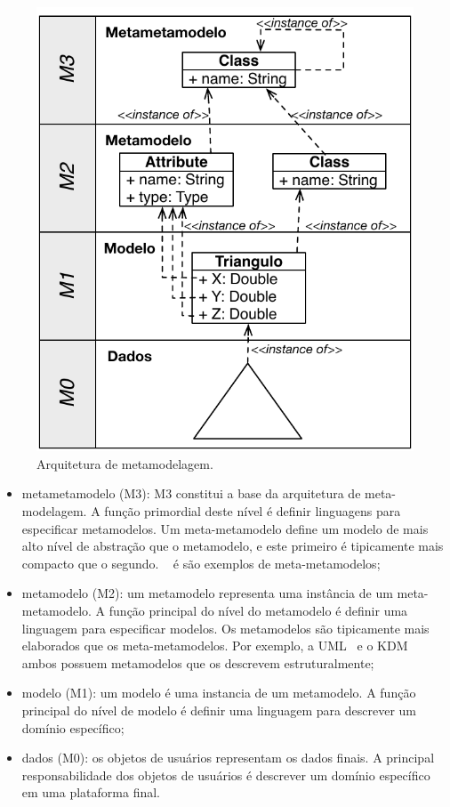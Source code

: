 \begin{figure}[htb]
 \caption{Arquitetura de metamodelagem.}
 \label{fig:metamodelosCamadas}
 \centering
 \includegraphics[scale=1]{images/Arquitetura_de_metamodelagem}
\end{figure}

\begin{itemize}
	\item metametamodelo (M3): M3 constitui a base da arquitetura de meta-modelagem. A função primordial deste nível é definir linguagens para especificar metamodelos. Um meta-metamodelo define um modelo de mais alto nível de abstração que o metamodelo, e este primeiro é tipicamente mais compacto que o segundo. ~\cite{MOF} é \cite{EMF} são exemplos de meta-metamodelos;
	\item metamodelo (M2): um metamodelo representa uma instância de um meta-metamodelo. A função principal do nível do metamodelo é definir uma linguagem para especificar modelos. Os metamodelos são tipicamente mais elaborados que os meta-metamodelos. Por exemplo, a UML~\cite{UML:OMG} e o KDM~\cite{KDM:ISO} ambos possuem metamodelos que os descrevem estruturalmente;
	\item modelo (M1): um modelo é uma instancia de um metamodelo. A função principal do nível de modelo é definir uma linguagem para descrever um domínio específico;
	\item dados (M0): os objetos de usuários representam os dados finais. A principal responsabilidade dos objetos de usuários é descrever um domínio específico em uma plataforma final.
\end{itemize}

